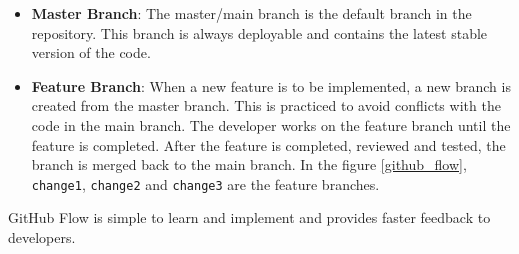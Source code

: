 \begin{itemize}
    \item \textbf{Master Branch}:\newline
    The master/main branch is the default branch in the repository. This branch is always deployable and contains the latest stable version of the code.

    \item \textbf{Feature Branch}:\newline
    When a new feature is to be implemented, a new branch is created from the master branch. This is practiced to avoid conflicts with the code in the main branch. 
    The developer works on the feature branch until the feature is completed. After the feature is completed, reviewed and tested, the branch is merged back to 
    the main branch. In the figure \ref{github_flow}, \texttt{change1}, \texttt{change2} and \texttt{change3} are the feature branches.
\end{itemize}

GitHub Flow is simple to learn and implement and provides faster feedback to developers. 

